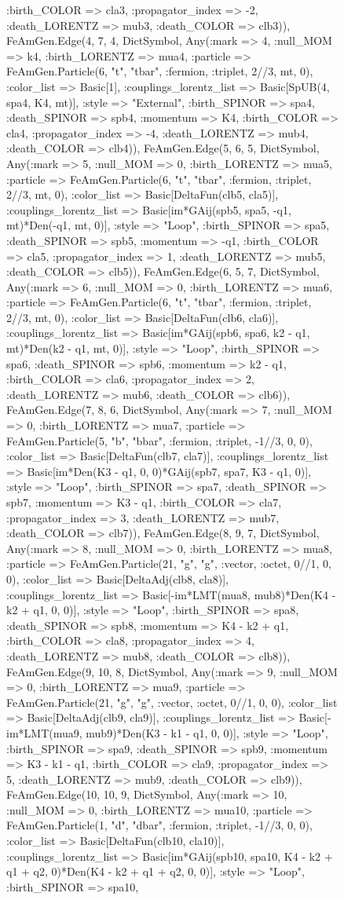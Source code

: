 \documentclass{revtex4}
\begin{document}
\begin{figure}[!htb]
\begin{center}
{:birth_COLOR => cla3, :propagator_index => -2, :death_LORENTZ => mub3, :death_COLOR => clb3)), FeAmGen.Edge(4, 7, 4, Dict{Symbol, Any}(:mark => 4, :null_MOM => k4, :birth_LORENTZ => mua4, :particle => FeAmGen.Particle(6, "t", "tbar", :fermion, :triplet, 2//3, mt, 0), :color_list => Basic[1], :couplings_lorentz_list => Basic[SpUB(4, spa4, K4, mt)], :style => "External", :birth_SPINOR => spa4, :death_SPINOR => spb4, :momentum => K4, :birth_COLOR => cla4, :propagator_index => -4, :death_LORENTZ => mub4, :death_COLOR => clb4)), FeAmGen.Edge(5, 6, 5, Dict{Symbol, Any}(:mark => 5, :null_MOM => 0, :birth_LORENTZ => mua5, :particle => FeAmGen.Particle(6, "t", "tbar", :fermion, :triplet, 2//3, mt, 0), :color_list => Basic[DeltaFun(clb5, cla5)], :couplings_lorentz_list => Basic[im*GAij(spb5, spa5, -q1, mt)*Den(-q1, mt, 0)], :style => "Loop", :birth_SPINOR => spa5, :death_SPINOR => spb5, :momentum => -q1, :birth_COLOR => cla5, :propagator_index => 1, :death_LORENTZ => mub5, :death_COLOR => clb5)), FeAmGen.Edge(6, 5, 7, Dict{Symbol, Any}(:mark => 6, :null_MOM => 0, :birth_LORENTZ => mua6, :particle => FeAmGen.Particle(6, "t", "tbar", :fermion, :triplet, 2//3, mt, 0), :color_list => Basic[DeltaFun(clb6, cla6)], :couplings_lorentz_list => Basic[im*GAij(spb6, spa6, k2 - q1, mt)*Den(k2 - q1, mt, 0)], :style => "Loop", :birth_SPINOR => spa6, :death_SPINOR => spb6, :momentum => k2 - q1, :birth_COLOR => cla6, :propagator_index => 2, :death_LORENTZ => mub6, :death_COLOR => clb6)), FeAmGen.Edge(7, 8, 6, Dict{Symbol, Any}(:mark => 7, :null_MOM => 0, :birth_LORENTZ => mua7, :particle => FeAmGen.Particle(5, "b", "bbar", :fermion, :triplet, -1//3, 0, 0), :color_list => Basic[DeltaFun(clb7, cla7)], :couplings_lorentz_list => Basic[im*Den(K3 - q1, 0, 0)*GAij(spb7, spa7, K3 - q1, 0)], :style => "Loop", :birth_SPINOR => spa7, :death_SPINOR => spb7, :momentum => K3 - q1, :birth_COLOR => cla7, :propagator_index => 3, :death_LORENTZ => mub7, :death_COLOR => clb7)), FeAmGen.Edge(8, 9, 7, Dict{Symbol, Any}(:mark => 8, :null_MOM => 0, :birth_LORENTZ => mua8, :particle => FeAmGen.Particle(21, "g", "g", :vector, :octet, 0//1, 0, 0), :color_list => Basic[DeltaAdj(clb8, cla8)], :couplings_lorentz_list => Basic[-im*LMT(mua8, mub8)*Den(K4 - k2 + q1, 0, 0)], :style => "Loop", :birth_SPINOR => spa8, :death_SPINOR => spb8, :momentum => K4 - k2 + q1, :birth_COLOR => cla8, :propagator_index => 4, :death_LORENTZ => mub8, :death_COLOR => clb8)), FeAmGen.Edge(9, 10, 8, Dict{Symbol, Any}(:mark => 9, :null_MOM => 0, :birth_LORENTZ => mua9, :particle => FeAmGen.Particle(21, "g", "g", :vector, :octet, 0//1, 0, 0), :color_list => Basic[DeltaAdj(clb9, cla9)], :couplings_lorentz_list => Basic[-im*LMT(mua9, mub9)*Den(K3 - k1 - q1, 0, 0)], :style => "Loop", :birth_SPINOR => spa9, :death_SPINOR => spb9, :momentum => K3 - k1 - q1, :birth_COLOR => cla9, :propagator_index => 5, :death_LORENTZ => mub9, :death_COLOR => clb9)), FeAmGen.Edge(10, 10, 9, Dict{Symbol, Any}(:mark => 10, :null_MOM => 0, :birth_LORENTZ => mua10, :particle => FeAmGen.Particle(1, "d", "dbar", :fermion, :triplet, -1//3, 0, 0), :color_list => Basic[DeltaFun(clb10, cla10)], :couplings_lorentz_list => Basic[im*GAij(spb10, spa10, K4 - k2 + q1 + q2, 0)*Den(K4 - k2 + q1 + q2, 0, 0)], :style => "Loop", :birth_SPINOR => spa10, }
\end{center}
\end{figure}
\end{document}
